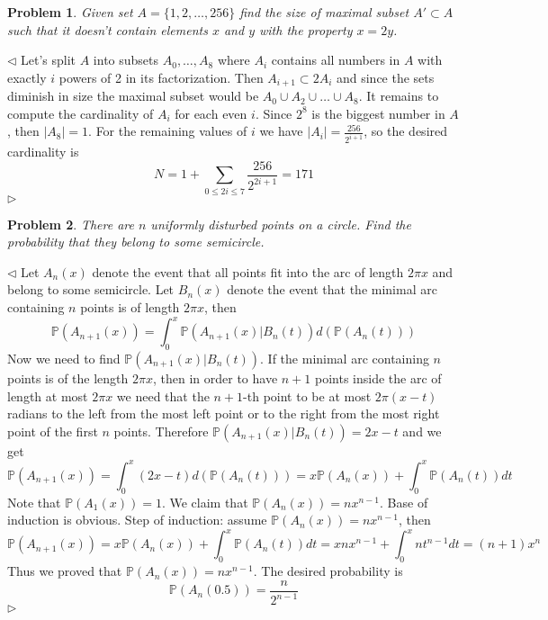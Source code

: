\documentclass[12pt]{article}
\newtheorem{problem}{Problem}[subsection]
\newenvironment{solution}{\par $\triangleleft$}{$\triangleright$}
\begin{document}
\begin{problem} Given set $A=\{1,2,\ldots,256\}$ find the size of maximal subset $A'\subset A$ such that it doesn't contain elements $x$ and $y$ with the property $x=2y$.
\end{problem}
\begin{solution} Let's split $A$ into subsets $A_0,\ldots,A_8$ where $A_i$ contains all numbers in $A$ with exactly $i$ powers of 2 in its factorization. Then $A_{i+1} \subset 2A_i$ and since the sets diminish in size the maximal subset would be $A_0\cup A_2\cup\ldots\cup A_8$. It remains to compute the cardinality of $A_i$ for each even $i$. Since $2^8$ is the biggest number in $A$, then $|A_8|=1$. For the remaining values of $i$ we have $|A_i|=\frac{256}{2^{i+1}}$, so the desired cardinality is
$$
N=1+\sum\limits_{0\leq 2i\leq 7}\frac{256}{2^{2i+1}}=171
$$
\end{solution}
 
\begin{problem} There are $n$ uniformly disturbed points on a circle. Find the probability that they belong to some semicircle.
\end{problem}
\begin{solution} Let $A_n(x)$ denote the event that all points fit into the arc of length $2\pi x$ and belong to some semicircle. Let $B_n(x)$ denote the event that the minimal arc containing $n$ points is of length $2\pi x$, then
$$
\mathbb{P}(A_{n+1}(x))=\int_0^x \mathbb{P}(A_{n+1}(x)|B_n(t)) d(\mathbb{P}(A_n(t)))
$$
Now we need to find $\mathbb{P}(A_{n+1}(x)|B_n(t))$. If the minimal arc containing $n$ points is of the length $2\pi x$, then in order to have $n+1$ points inside the arc of length at most $2\pi x$ we need that the $n+1$-th point to be at most $2\pi(x-t)$ radians to the left from the most left point or to the right from the most right point of the first $n$ points. Therefore $\mathbb{P}(A_{n+1}(x)|B_n(t))=2x-t$ and we get
$$
\mathbb{P}(A_{n+1}(x))=\int_0^x (2x-t) d(\mathbb{P}(A_n(t)))
=x\mathbb{P}(A_n(x))+\int_0^x \mathbb{P}(A_n(t))dt
$$
Note that $\mathbb{P}(A_1(x))=1$. We claim that $\mathbb{P}(A_n(x))=n x^{n-1}$. Base of induction is obvious. Step of induction: assume $\mathbb{P}(A_n(x))=n x^{n-1}$, then
$$
\mathbb{P}(A_{n+1}(x))
=x\mathbb{P}(A_n(x))+\int_0^x \mathbb{P}(A_n(t))dt
=xn x^{n-1}+\int_0^x n t^{n-1}dt
=(n+1)x^n
$$
Thus we proved that $\mathbb{P}(A_n(x))=n x^{n-1}$. The desired probability is 
$$
\mathbb{P}(A_n(0.5))=\frac{n}{2^{n-1}}
$$
\end{solution}
 
\end{document}
